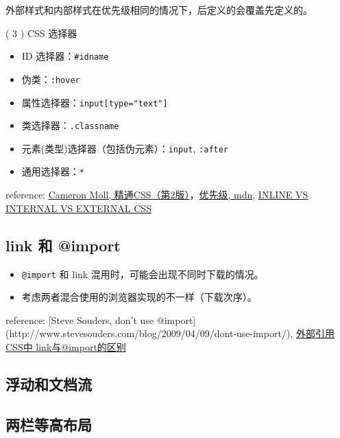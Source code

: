 外部样式和内部样式在优先级相同的情况下，后定义的会覆盖先定义的。

( 3 ) CSS 选择器

\begin{itemize}
\tightlist
\item
  ID 选择器：\lstinline!#idname!
\item
  伪类：\lstinline!:hover!
\item
  属性选择器：\lstinline!input[type="text"]!
\item
  类选择器：\lstinline!.classname!
\item
  元素(类型)选择器（包括伪元素）：\lstinline!input!, \lstinline!:after!
\item
  通用选择器：\lstinline!*!
\end{itemize}

reference: \href{http://book.douban.com/subject/4736167/}{Cameron Moll,
精通CSS（第2版）}，\href{https://developer.mozilla.org/zh-CN/docs/Web/CSS/Specificity}{优先级,
mdn},
\href{https://vineetgupta22.wordpress.com/2011/07/09/inline-vs-internal-vs-external-css/}{INLINE
VS INTERNAL VS EXTERNAL CSS}

\subsection{link 和 @import}\label{link-ux548c-import}

\begin{itemize}
\tightlist
\item
  \lstinline!@import! 和 link 混用时，可能会出现不同时下载的情况。
\item
  考虑两者混合使用的浏览器实现的不一样（下载次序）。
\end{itemize}

reference: {[}Steve Souders, don't use
@import{]}(http://www.stevesouders.com/blog/2009/04/09/dont-use-import/),
\href{http://www.dreamdu.com/blog/2007/05/11/css_link_import/}{外部引用CSS中
link与@import的区别}

\subsection{浮动和文档流}\label{ux6d6eux52a8ux548cux6587ux6863ux6d41}

\subsection{两栏等高布局}\label{ux4e24ux680fux7b49ux9ad8ux5e03ux5c40}

